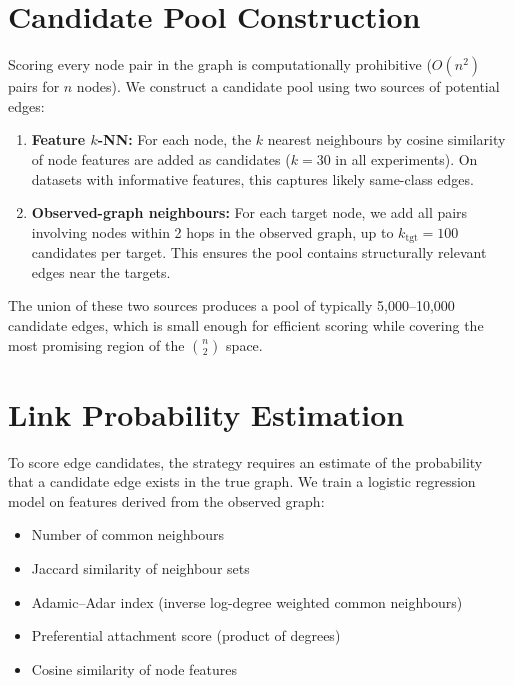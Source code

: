 \documentclass[12pt,a4paper,oneside]{report}
\begin{document}
\section{Candidate Pool Construction}

Scoring every node pair in the graph is computationally prohibitive ($O(n^2)$ pairs for $n$ nodes). We construct a candidate pool using two sources of potential edges:

\begin{enumerate}[leftmargin=2em]
    \item \textbf{Feature $k$-NN:} For each node, the $k$ nearest neighbours by cosine similarity of node features are added as candidates ($k = 30$ in all experiments). On datasets with informative features, this captures likely same-class edges.
    \item \textbf{Observed-graph neighbours:} For each target node, we add all pairs involving nodes within 2 hops in the observed graph, up to $k_{\text{tgt}} = 100$ candidates per target. This ensures the pool contains structurally relevant edges near the targets.
\end{enumerate}

The union of these two sources produces a pool of typically 5,000--10,000 candidate edges, which is small enough for efficient scoring while covering the most promising region of the $\binom{n}{2}$ space.

\section{Link Probability Estimation}
\label{sec:linkprob}

To score edge candidates, the strategy requires an estimate of the probability that a candidate edge exists in the true graph. We train a logistic regression model on features derived from the observed graph:

\begin{itemize}[leftmargin=2em]
    \item Number of common neighbours
    \item Jaccard similarity of neighbour sets
    \item Adamic--Adar index (inverse log-degree weighted common neighbours)
    \item Preferential attachment score (product of degrees)
    \item Cosine similarity of node features
\end{itemize}
\end{document}
